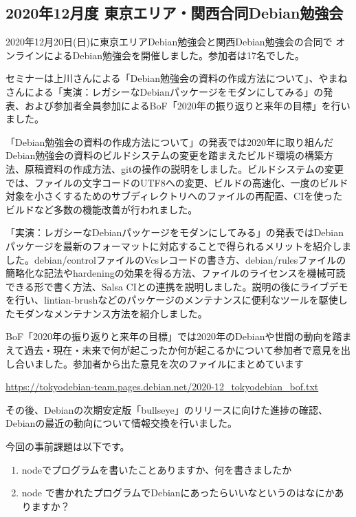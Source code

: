 \documentclass[mingoth,a4paper]{jsarticle}
\begin{document}

\subsection{2020年12月度 東京エリア・関西合同Debian勉強会}

2020年12月20日(日)に東京エリアDebian勉強会と関西Debian勉強会の合同で
オンラインによるDebian勉強会を開催しました。参加者は17名でした。

セミナーは上川さんによる「Debian勉強会の資料の作成方法について」、やまねさんによる「実演：レガシーなDebianパッケージをモダンにしてみる」の発表、および参加者全員参加によるBoF「2020年の振り返りと来年の目標」を行いました。

「Debian勉強会の資料の作成方法について」の発表では2020年に取り組んだDebian勉強会の資料のビルドシステムの変更を踏まえたビルド環境の構築方法、原稿資料の作成方法、gitの操作の説明をしました。ビルドシステムの変更では、ファイルの文字コードのUTF8への変更、ビルドの高速化、一度のビルド対象を小さくするためのサブディレクトリへのファイルの再配置、CIを使ったビルドなど多数の機能改善が行われました。

「実演：レガシーなDebianパッケージをモダンにしてみる」の発表ではDebianパッケージを最新のフォーマットに対応することで得られるメリットを紹介しました。debian/controlファイルのVcsレコードの書き方、debian/rulesファイルの簡略化な記法やhardeningの効果を得る方法、ファイルのライセンスを機械可読できる形で書く方法、Salsa CIとの連携を説明しました。説明の後にライブデモを行い、lintian-brushなどのパッケージのメンテナンスに便利なツールを駆使したモダンなメンテナンス方法を紹介しました。

BoF「2020年の振り返りと来年の目標」では2020年のDebianや世間の動向を踏まえて過去・現在・未来で何が起こったか何が起こるかについて参加者で意見を出し合いました。参加者から出た意見を次のファイルにまとめています

\url{https://tokyodebian-team.pages.debian.net/2020-12_tokyodebian_bof.txt}

その後、Debianの次期安定版「bullseye」のリリースに向けた進捗の確認、
Debianの最近の動向について情報交換を行いました。


今回の事前課題は以下です。

\begin{enumerate}
 \item nodeでプログラムを書いたことありますか、何を書きましたか
 \item node で書かれたプログラムでDebianにあったらいいなというのはなにかありますか？
\end{enumerate}
\end{document}
